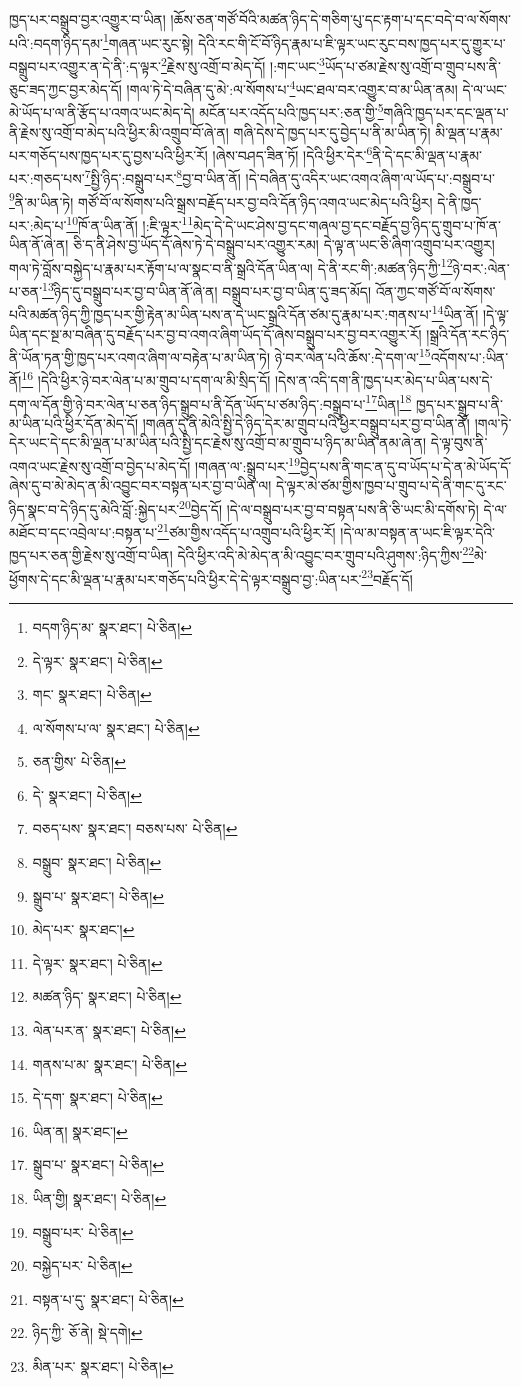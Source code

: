 ཁྱད་པར་བསྒྲུབ་བྱར་འགྱུར་བ་ཡིན། །ཆོས་ཅན་གཙོ་བོའི་མཚན་ཉིད་དེ་གཅིག་པུ་དང་རྟག་པ་དང་བདེ་བ་ལ་སོགས་པའི་:བདག་ཉིད་དམ་\footnote{བདག་ཉིད་མ་  སྣར་ཐང་།  པེ་ཅིན། }གཞན་ཡང་རུང་སྟེ། དེའི་རང་གི་ངོ་བོ་ཉིད་རྣམ་པ་ཇི་ལྟར་ཡང་རུང་བས་ཁྱད་པར་དུ་གྱུར་པ་བསྒྲུབ་པར་འགྱུར་ན་དེ་ནི་:ད་ལྟར་\footnote{དེ་ལྟར་  སྣར་ཐང་།  པེ་ཅིན། }རྗེས་སུ་འགྲོ་བ་མེད་དོ། །:གང་ཡང་\footnote{གང་  སྣར་ཐང་།  པེ་ཅིན། }ཡོད་པ་ཙམ་རྗེས་སུ་འགྲོ་བ་གྲུབ་པས་ནི་ཅུང་ཟད་ཀྱང་བྱར་མེད་དོ། །གལ་ཏེ་དེ་བཞིན་དུ་མེ་:ལ་སོགས་པ་\footnote{ལ་སོགས་པ་ལ་  སྣར་ཐང་།  པེ་ཅིན། }ཡང་ཐལ་བར་འགྱུར་བ་མ་ཡིན་ནམ། དེ་ལ་ཡང་མེ་ཡོད་པ་ལ་ནི་རྩོད་པ་འགའ་ཡང་མེད་དེ། མངོན་པར་འདོད་པའི་ཁྱད་པར་:ཅན་གྱི་\footnote{ཅན་གྱིས་  པེ་ཅིན། }གཞིའི་ཁྱད་པར་དང་ལྡན་པ་ནི་རྗེས་སུ་འགྲོ་བ་མེད་པའི་ཕྱིར་མི་འགྲུབ་བོ་ཞེ་ན། གཞི་དེས་དེ་ཁྱད་པར་དུ་བྱེད་པ་ནི་མ་ཡིན་ཏེ། མི་ལྡན་པ་རྣམ་པར་གཅོད་པས་ཁྱད་པར་དུ་བྱས་པའི་ཕྱིར་རོ། །ཞེས་བཤད་ཟིན་ཏོ། །དེའི་ཕྱིར་དེར་\footnote{དེ་  སྣར་ཐང་།  པེ་ཅིན། }ནི་དེ་དང་མི་ལྡན་པ་རྣམ་པར་:གཅད་པས་\footnote{བཅད་པས་  སྣར་ཐང་། བཅས་པས་  པེ་ཅིན། }སྤྱི་ཉིད་:བསྒྲུབ་པར་\footnote{བསྒྲུབ་  སྣར་ཐང་།  པེ་ཅིན། }བྱ་བ་ཡིན་ནོ། །དེ་བཞིན་དུ་འདིར་ཡང་འགའ་ཞིག་ལ་ཡོད་པ་:བསྒྲུབ་པ་\footnote{སྒྲུབ་པ་  སྣར་ཐང་།  པེ་ཅིན། }ནི་མ་ཡིན་ཏེ། གཙོ་བོ་ལ་སོགས་པའི་སྒྲས་བརྗོད་པར་བྱ་བའི་དོན་ཉིད་འགའ་ཡང་མེད་པའི་ཕྱིར། དེ་ནི་ཁྱད་པར་:མེད་པ་\footnote{མེད་པར་  སྣར་ཐང་། }ཁོ་ན་ཡིན་ནོ། །:ཇི་ལྟར་\footnote{དེ་ལྟར་  སྣར་ཐང་།  པེ་ཅིན། }མེད་དེ་དེ་ཡང་ཤེས་བྱ་དང་གཞལ་བྱ་དང་བརྗོད་བྱ་ཉིད་དུ་གྲུབ་པ་ཁོ་ན་ཡིན་ནོ་ཞེ་ན། ཅི་ད་ནི་ཤེས་བྱ་ཡོད་དོ་ཞེས་ཏེ་དེ་བསྒྲུབ་པར་འགྱུར་རམ། དེ་ལྟ་ན་ཡང་ཅི་ཞིག་འགྲུབ་པར་འགྱུར། གལ་ཏེ་བློས་བསྐྱེད་པ་རྣམ་པར་རྟོག་པ་ལ་སྣང་བ་ནི་སྒྲའི་དོན་ཡིན་ལ། དེ་ནི་རང་གི་:མཚན་ཉིད་ཀྱི་\footnote{མཚན་ཉིད་  སྣར་ཐང་།  པེ་ཅིན། }ཉེ་བར་:ལེན་པ་ཅན་\footnote{ལེན་པར་ན་  སྣར་ཐང་།  པེ་ཅིན། }ཉིད་དུ་བསྒྲུབ་པར་བྱ་བ་ཡིན་ནོ་ཞེ་ན། བསྒྲུབ་པར་བྱ་བ་ཡིན་དུ་ཟད་མོད། འོན་ཀྱང་གཙོ་བོ་ལ་སོགས་པའི་མཚན་ཉིད་ཀྱི་ཁྱད་པར་གྱི་རྟེན་མ་ཡིན་པས་ན་དེ་ཡང་སྒྲའི་དོན་ཙམ་དུ་རྣམ་པར་:གནས་པ་\footnote{གནས་པ་མ་  སྣར་ཐང་།  པེ་ཅིན། }ཡིན་ནོ། །དེ་ལྟ་ཡིན་དང་སྔ་མ་བཞིན་དུ་བརྗོད་པར་བྱ་བ་འགའ་ཞིག་ཡོད་དོ་ཞེས་བསྒྲུབ་པར་བྱ་བར་འགྱུར་རོ། །སྒྲའི་དོན་རང་ཉིད་ནི་ཡོན་ཏན་གྱི་ཁྱད་པར་འགའ་ཞིག་ལ་བརྟེན་པ་མ་ཡིན་ཏེ། ཉེ་བར་ལེན་པའི་ཆོས་:དེ་དག་ལ་\footnote{དེ་དག་  སྣར་ཐང་།  པེ་ཅིན། }འདོགས་པ་:ཡིན་ནོ།\footnote{ཡིན་ན།  སྣར་ཐང་། } །དེའི་ཕྱིར་ཉེ་བར་ལེན་པ་མ་གྲུབ་པ་དག་ལ་མི་སྲིད་དོ། །དེས་ན་འདི་དག་ནི་ཁྱད་པར་མེད་པ་ཡིན་པས་དེ་དག་ལ་དོན་གྱི་ཉེ་བར་ལེན་པ་ཅན་ཉིད་སྒྲུབ་པ་ནི་དོན་ཡོད་པ་ཙམ་ཉིད་:བསྒྲུབ་པ་\footnote{སྒྲུབ་པ་  སྣར་ཐང་།  པེ་ཅིན། }ཡིན།\footnote{ཡིན་གྱི།  སྣར་ཐང་།  པེ་ཅིན། } ཁྱད་པར་སྒྲུབ་པ་ནི་མ་ཡིན་པའི་ཕྱིར་དོན་མེད་དོ། །གཞན་དུ་ནི་མེའི་སྤྱི་དེ་ཉིད་དེར་མ་གྲུབ་པའི་ཕྱིར་བསྒྲུབ་པར་བྱ་བ་ཡིན་ནོ། །གལ་ཏེ་དེར་ཡང་དེ་དང་མི་ལྡན་པ་མ་ཡིན་པའི་སྤྱི་དང་རྗེས་སུ་འགྲོ་བ་མ་གྲུབ་པ་ཉིད་མ་ཡིན་ནམ་ཞེ་ན། དེ་ལྟ་བུས་ནི་འགའ་ཡང་རྗེས་སུ་འགྲོ་བ་བྱེད་པ་མེད་དོ། །གཞན་ལ་:སྒྲུབ་པར་\footnote{བསྒྲུབ་པར་  པེ་ཅིན། }བྱེད་པས་ནི་གང་ན་དུ་བ་ཡོད་པ་དེ་ན་མེ་ཡོད་དོ་ཞེས་དུ་བ་མེ་མེད་ན་མི་འབྱུང་བར་བསྟན་པར་བྱ་བ་ཡིན་ལ། དེ་ལྟར་མེ་ཙམ་གྱིས་ཁྱབ་པ་གྲུབ་པ་དེ་ནི་གང་དུ་རང་ཉིད་སྣང་བ་དེ་ཉིད་དུ་མེའི་བློ་:སྐྱེད་པར་\footnote{བསྐྱེད་པར་  པེ་ཅིན། }བྱེད་དོ། །དེ་ལ་བསྒྲུབ་པར་བྱ་བ་བསྟན་པས་ནི་ཅི་ཡང་མི་དགོས་ཏེ། དེ་ལ་མཐོང་བ་དང་འབྲེལ་པ་:བསྟན་པ་\footnote{བསྟན་པ་དུ་  སྣར་ཐང་།  པེ་ཅིན། }ཙམ་གྱིས་འདོད་པ་འགྲུབ་པའི་ཕྱིར་རོ། །དེ་ལ་མ་བསྟན་ན་ཡང་ཇི་ལྟར་དེའི་ཁྱད་པར་ཅན་གྱི་རྗེས་སུ་འགྲོ་བ་ཡིན། དེའི་ཕྱིར་འདི་མེ་མེད་ན་མི་འབྱུང་བར་གྲུབ་པའི་ཤུགས་:ཉིད་ཀྱིས་\footnote{ཉིད་ཀྱི་  ཅོ་ནེ།  སྡེ་དགེ། }མེ་ཕྱོགས་དེ་དང་མི་ལྡན་པ་རྣམ་པར་གཅོད་པའི་ཕྱིར་དེ་དེ་ལྟར་བསྒྲུབ་བྱ་:ཡིན་པར་\footnote{མིན་པར་  སྣར་ཐང་།  པེ་ཅིན། }བརྗོད་དོ། 